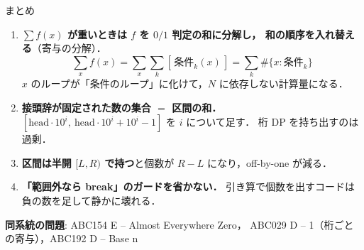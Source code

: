 \documentclass[dvipdfmx,aspectratio=169]{beamer}
\begin{document}
\begin{frame}{まとめ}
  \begin{enumerate}
    \item \textbf{$\sum f(x)$ が重いときは $f$ を $0/1$ 判定の和に分解し，
      和の順序を入れ替える}（寄与の分解）．
      \[
        \sum_x f(x) = \sum_x \sum_k [\,\text{条件}_k(x)\,] = \sum_k \#\{x : \text{条件}_k\}
      \]
      $x$ のループが「条件のループ」に化けて，$N$ に依存しない計算量になる．
    \item \textbf{接頭辞が固定された数の集合 $=$ 区間の和．}
      $[\mathrm{head}\cdot 10^i,\ \mathrm{head}\cdot 10^i + 10^i - 1]$ を $i$ について足す．
      桁 DP を持ち出すのは過剰．
    \item \textbf{区間は半開 $[L, R)$ で持つ}と個数が $R-L$ になり，off-by-one が減る．
    \item \textbf{「範囲外なら break」のガードを省かない．}
      引き算で個数を出すコードは負の数を足して静かに壊れる．
  \end{enumerate}

  \vspace{0.4em}
  \textbf{同系統の問題}: ABC154 E -- Almost Everywhere Zero，
  ABC029 D -- 1（桁ごとの寄与），ABC192 D -- Base n
\end{frame}
\end{document}
